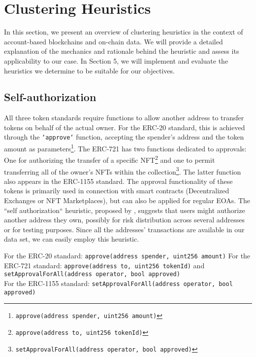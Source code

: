 \documentclass[12pt,a4paper,titlepage,oneside,english]{article}
\begin{document}

\section{Clustering Heuristics}
In this section, we present an overview of clustering heuristics in the context of account-based blockchains and on-chain data. We will provide a detailed explanation of the mechanics and rationale behind the heuristic and assess its applicability to our case. 
In Section 5, we will implement and evaluate the heuristics we determine to be suitable for our objectives.

\subsection{Self-authorization} 
	All three token standards require functions to allow another address to transfer tokens on behalf of the actual owner. For the ERC-20 standard, this is achieved through the \texttt{`approve`} function, accepting the spender's address and the token amount as parameters\footnote{\texttt{approve(address spender, uint256 amount)}}. The ERC-721 has two functions dedicated to approvals: One for authorizing the transfer of a specific NFT\footnote{\texttt{approve(address to, uint256 tokenId)}} and one to permit transferring all of the owner's NFTs within the collection\footnote{\texttt{setApprovalForAll(address operator, bool approved)}}. The latter function also appears in the ERC-1155 standard. The approval functionality of these tokens is primarily used in connection with smart contracts (Decentralized Exchanges or NFT Marketplaces), but can also be applied for regular EOAs. \newline
The ``self authorization`` heuristic, proposed by \cite{FV:17}, suggests that users might authorize another address they own, possibly for risk distribution across several addresses or for testing purposes. \newline
Since all the addresses' transactions are available in our data set, we can easily employ this heuristic. %


\iffalse
	For the ERC-20 standard: \texttt{approve(address spender, uint256 amount)}
	For the ERC-721 standard: \texttt{approve(address to, uint256 tokenId)} and \texttt{setApprovalForAll(address operator, bool approved)}\\
	For the ERC-1155 standard: \texttt{setApprovalForAll(address operator, bool approved)}
	
\end{document}
